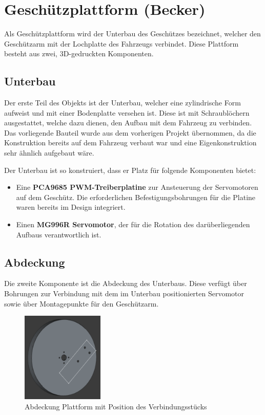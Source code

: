 \section{Geschützplattform (Becker)}

Als Geschützplattform wird der Unterbau des Geschützes
bezeichnet, welcher den Geschützarm mit der Lochplatte des
Fahrzeugs verbindet. Diese Plattform besteht aus zwei,
3D-gedruckten Komponenten.

\subsection{Unterbau}

Der erste Teil des Objekts ist der Unterbau, welcher eine zylindrische Form aufweist und mit einer Bodenplatte versehen ist. 
Diese ist mit Schraublöchern ausgestattet, welche dazu dienen, den Aufbau mit dem Fahrzeug zu verbinden. 
Das vorliegende Bauteil wurde aus dem vorherigen Projekt übernommen, da die Konstruktion bereits auf dem Fahrzeug verbaut war 
und eine Eigenkonstruktion sehr ähnlich aufgebaut wäre.

Der Unterbau ist so konstruiert, dass er Platz für folgende Komponenten bietet:
\begin{itemize}
    \item Eine \textbf{PCA9685 PWM-Treiberplatine} zur Ansteuerung der
     Servomotoren auf dem Geschütz. Die erforderlichen Befestigungsbohrungen für die Platine waren bereits im Design integriert.
    \item Einen \textbf{MG996R Servomotor}, der für die Rotation des
     darüberliegenden Aufbaus verantwortlich ist.
\end{itemize}

\subsection{Abdeckung}
  
Die zweite Komponente ist die Abdeckung des Unterbaus. Diese
verfügt über Bohrungen zur Verbindung mit dem im Unterbau
positionierten Servomotor sowie über Montagepunkte für den
Geschützarm.

\begin{figure}[ht]
    \centering
    \includegraphics[width=0.35\textwidth, keepaspectratio]{images/becker_cad_platform.png}
    \caption{Abdeckung Plattform mit Position des Verbindungsstücks}
    \label{fig:cad_platform}
\end{figure}

